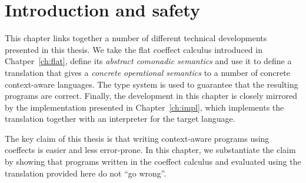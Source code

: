 \section{Introduction and safety}
\label{sec:semantics-intro}

This chapter links together a number of different technical developments presented in this thesis.
We take the flat coeffect calculus introduced in Chatper~\ref{ch:flat}, define its \emph{abstract
comonadic semantics} and use it to define a translation that gives a \emph{concrete operational
semantics} to a number of concrete context-aware languages. The type system is used to guarantee
that the resulting programs are correct. Finally, the development in this chapter is closely
mirrored by the implementation presented in Chapter~\ref{ch:impl}, which implements the
translation together with an interpreter for the target language.

The key claim of this thesis is that writing context-aware programs using coeffects is easier and
less error-prone. In this chapter, we substantiate the claim by showing that programs written in the
coeffect calculus and evaluated using the translation provided here do not ``go wrong''.

